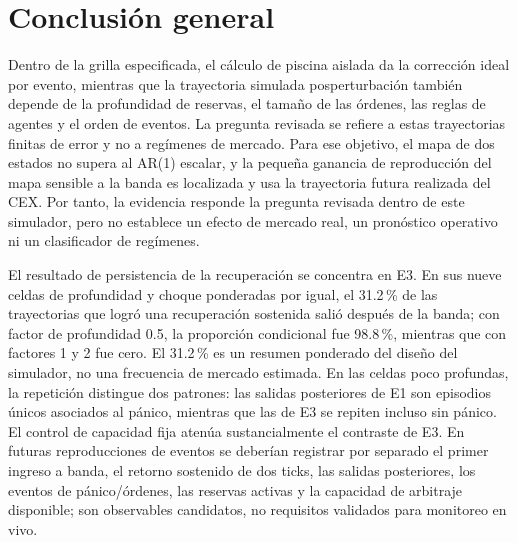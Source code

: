 \section{Conclusión general}

Dentro de la grilla especificada, el cálculo de piscina aislada da la corrección ideal por evento, mientras que la trayectoria simulada posperturbación también depende de la profundidad de reservas, el tamaño de las órdenes, las reglas de agentes y el orden de eventos. La pregunta revisada se refiere a estas trayectorias finitas de error y no a regímenes de mercado. Para ese objetivo, el mapa de dos estados no supera al AR(1) escalar, y la pequeña ganancia de reproducción del mapa sensible a la banda es localizada y usa la trayectoria futura realizada del CEX. Por tanto, la evidencia responde la pregunta revisada dentro de este simulador, pero no establece un efecto de mercado real, un pronóstico operativo ni un clasificador de regímenes.

El resultado de persistencia de la recuperación se concentra en E3. En sus nueve celdas de profundidad y choque ponderadas por igual, el 31.2\,\% de las trayectorias que logró una recuperación sostenida salió después de la banda; con factor de profundidad 0.5, la proporción condicional fue 98.8\,\%, mientras que con factores 1 y 2 fue cero. El 31.2\,\% es un resumen ponderado del diseño del simulador, no una frecuencia de mercado estimada. En las celdas poco profundas, la repetición distingue dos patrones: las salidas posteriores de E1 son episodios únicos asociados al pánico, mientras que las de E3 se repiten incluso sin pánico. El control de capacidad fija atenúa sustancialmente el contraste de E3. En futuras reproducciones de eventos se deberían registrar por separado el primer ingreso a banda, el retorno sostenido de dos ticks, las salidas posteriores, los eventos de pánico/órdenes, las reservas activas y la capacidad de arbitraje disponible; son observables candidatos, no requisitos validados para monitoreo en vivo.


